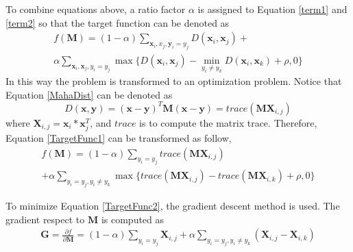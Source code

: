  
 To combine equations above, a ratio factor $\alpha$ is assigned to Equation \eqref{term1} and \eqref{term2} so that the target function can be denoted as 
  \begin{equation}
  \label{TargetFunc1}
  \begin{aligned}
 f(\bm{M}) = (1-\alpha)\sum_{\bm{x}_i,x_j,\bm{y}_i=y_j} D(\bm{x}_i,\bm{x}_j) + \\
  \alpha \sum_{\bm{x}_i,\bm{x}_j,y_i=y_j}\max\{{D(\bm{x}_i,\bm{x}_j)-\min_{y_i\ne y_k}{D(\bm{x}_i,\bm{x}_k)}+\rho,0}\}
 \end{aligned}
 \end{equation}
 In this way the problem is transformed to an optimization problem. Notice that Equation \ref{MahaDist} can be denoted as 
 \begin{equation}
 D(\bm{x},\bm{y}) = (\bm{x} - \bm{y})^T\bm{M}(\bm{x} - \bm{y}) = trace(\bm{M}\bm{X}_{i,j})
 \end{equation}
 where $\bm{X}_{i,j} = \bm{x}_i*\bm{x}_j^T$, and $trace$ is to compute the matrix trace. Therefore, Equation \ref{TargetFunc1} can be transformed as follow,
 \begin{equation}
 \label{TargetFunc2}
 \begin{aligned}
 f(\bm{M}) = (1-\alpha)\sum_{y_i = y_j}trace(\bm{M}\bm{X}_{i,j}) \\
  + \alpha \sum_{y_i = y_j,y_i\ne y_k}\max\{trace(\bm{M}\bm{X}_{i,j}) - trace(\bm{M}\bm{X}_{i,k} )+ \rho,0\}
 \end{aligned}
 \end{equation}
 
 To minimize Equation \ref{TargetFunc2}, the gradient descent method is used. The gradient respect to $\bm{M}$ is computed as
 \begin{equation}
 \begin{aligned}
\bm{G} =  \frac{\partial f}{\partial \bm{M}} = (1-\alpha) \sum_{y_i = y_j} \bm{X}_{i,j} 
 + \alpha \sum_{y_i = y_j, y_i \ne y_k}(\bm{X}_{i,j} - \bm{X}_{i,k})
 \end{aligned}
 \end{equation}
 
